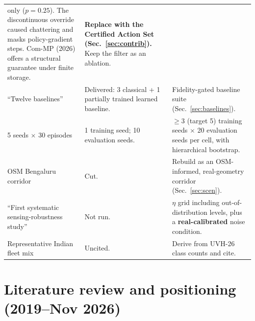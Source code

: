 \documentclass[11pt,a4paper]{article}
\begin{document}
\begin{longtable}{@{}p{3.6cm}p{5.6cm}p{6.6cm}@{}}
  only ($p=0.25$). The discontinuous override caused chattering and masks policy-gradient
  steps. Com-MP (2026) offers a structural guarantee under finite storage. &
  \textbf{Replace with the Certified Action Set (Sec.~\ref{sec:contrib}).} Keep the filter
  as an ablation. \\
``Twelve baselines'' &
  Delivered: 3 classical + 1 partially trained learned baseline. &
  Fidelity-gated baseline suite (Sec.~\ref{sec:baselines}). \\
5 seeds $\times$ 30 episodes &
  1 training seed; 10 evaluation seeds. &
  $\ge$3 (target 5) training seeds $\times$ 20 evaluation seeds per cell, with hierarchical
  bootstrap. \\
OSM Bengaluru corridor &
  Cut. &
  Rebuild as an OSM-informed, real-geometry corridor (Sec.~\ref{sec:scen}). \\
``First systematic sensing-robustness study'' &
  Not run. &
  $\eta$ grid including out-of-distribution levels, plus a \textbf{real-calibrated} noise
  condition. \\
Representative Indian fleet mix &
  Uncited. &
  Derive from UVH-26 class counts and cite. \\
\bottomrule
\end{longtable}
\normalsize

\section{Literature review and positioning (2019--Nov 2026)}
\end{document}
